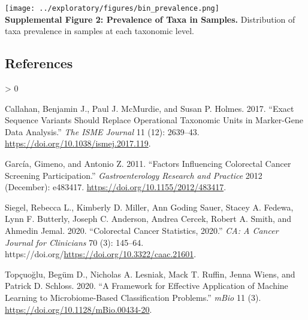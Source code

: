 \documentclass[
]{article}
\newlength{\cslhangindent}
\newenvironment{CSLReferences}[2] %
 {%
  \setlength{\parindent}{0pt}
  \ifodd #1 \everypar{\setlength{\hangindent}{\cslhangindent}}\ignorespaces\fi
  \ifnum #2 > 0
  \setlength{\parskip}{#2\baselineskip}
  \fi
 }%
 {}
\begin{document}
\texttt{[image: ../exploratory/figures/bin\_prevalence.png]}\\
\textbf{Supplemental Figure 2: Prevalence of Taxa in Samples.}
Distribution of taxa prevalence in samples at each taxonomic level.

\hypertarget{references}{%
\subsection*{References}\label{references}}

\hypertarget{refs}{}
\begin{CSLReferences}{1}{0}
\leavevmode\hypertarget{ref-callahan2017}{}%
Callahan, Benjamin J., Paul J. McMurdie, and Susan P. Holmes. 2017.
{``Exact Sequence Variants Should Replace Operational Taxonomic Units in
Marker-Gene Data Analysis.''} \emph{The ISME Journal} 11 (12): 2639--43.
\url{https://doi.org/10.1038/ismej.2017.119}.

\leavevmode\hypertarget{ref-garcuxeda2011a}{}%
García, Gimeno, and Antonio Z. 2011. {``Factors Influencing Colorectal
Cancer Screening Participation.''} \emph{Gastroenterology Research and
Practice} 2012 (December): e483417.
\url{https://doi.org/10.1155/2012/483417}.

\leavevmode\hypertarget{ref-siegel2020}{}%
Siegel, Rebecca L., Kimberly D. Miller, Ann Goding Sauer, Stacey A.
Fedewa, Lynn F. Butterly, Joseph C. Anderson, Andrea Cercek, Robert A.
Smith, and Ahmedin Jemal. 2020. {``Colorectal Cancer Statistics,
2020.''} \emph{CA: A Cancer Journal for Clinicians} 70 (3): 145--64.
https://doi.org/\url{https://doi.org/10.3322/caac.21601}.

\leavevmode\hypertarget{ref-topuxe7uolu2020}{}%
Topçuoğlu, Begüm D., Nicholas A. Lesniak, Mack T. Ruffin, Jenna Wiens,
and Patrick D. Schloss. 2020. {``A Framework for Effective Application
of Machine Learning to Microbiome-Based Classification Problems.''}
\emph{mBio} 11 (3). \url{https://doi.org/10.1128/mBio.00434-20}.

\end{CSLReferences}
\end{document}
